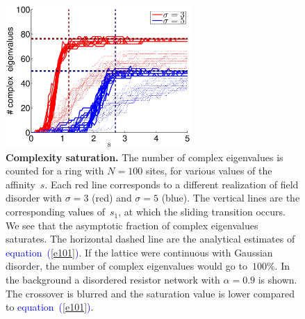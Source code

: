 \documentclass[aps,pre,floats,floatfix,twocolumn]{revtex4}
\newcommand{\Eq}[1]{\textcolor{blue}{{equation}\!~(\ref{#1})}}
\begin{document}
\begin{figure}
\includegraphics[height=5.4cm]{numComplex_100_alpha_sigma}

\caption{\label{figCplxSat}
{\bf Complexity saturation.}
The number of complex eigenvalues is counted for a ring with $N{=}100$ sites, 
for various values of the affinity~$s$. Each red line corresponds to a different
realization of field disorder with $\sigma{=}3$ (red) and $\sigma{=}5$ (blue). 
The vertical lines are the corresponding values of~$s_1$, 
at which the sliding transition occurs. 
We see that the asymptotic fraction of complex eigenvalues saturates. 
The horizontal dashed line are the analytical estimates of \Eq{e101}. 
If the lattice were continuous with Gaussian disorder, 
the number of complex eigenvalues would go to~$100\%$.
In the background a disordered resistor network with ${\alpha=0.9}$ is shown. 
The crossover is blurred and the saturation value is lower compared to \Eq{e101}.  
}
\end{figure}
\end{document}
